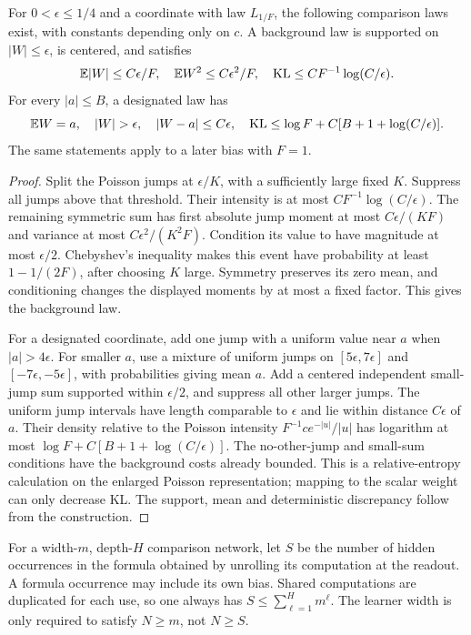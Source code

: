 \begin{lemma}
\label{lem:VG-scalar-comparison}
For $0<\epsilon\le1/4$ and a coordinate with law $L_{1/F}$, the following comparison laws exist, with constants depending only on $c$.
A background law is supported on $|W|\le\epsilon$, is centered, and satisfies
\[
 \mathbb E|W|\le C\epsilon/F,\quad
 \mathbb E W^2\le C\epsilon^2/F,\quad
 \operatorname{KL}\le C F^{-1}\log(C/\epsilon).
\]
For every $|a|\le B$, a designated law has
\[
 \E W=a,\quad |W|>\epsilon,\quad |W-a|\le C\epsilon,\quad
 \KL\le\log F+C[B+1+\log(C/\epsilon)].
\]
The same statements apply to a later bias with $F=1$.
\end{lemma}
\begin{proof}
Split the Poisson jumps at $\epsilon/K$, with a sufficiently large fixed $K$. Suppress all jumps above that threshold. Their intensity is at most
$CF^{-1}\log(C/\epsilon)$. The remaining symmetric sum has first absolute jump moment at most $C\epsilon/(KF)$ and variance at most
$C\epsilon^2/(K^2F)$. Condition its value to have magnitude at most $\epsilon/2$. Chebyshev's inequality makes this event have probability at least $1-1/(2F)$, after choosing $K$ large. Symmetry preserves its zero mean, and conditioning changes the displayed moments by at most a fixed factor. This gives the background law.

For a designated coordinate, add one jump with a uniform value near $a$ when $|a|>4\epsilon$. For smaller $a$, use a mixture of uniform jumps on $[5\epsilon,7\epsilon]$ and $[-7\epsilon,-5\epsilon]$, with probabilities giving mean $a$. Add a centered independent small-jump sum supported within $\epsilon/2$, and suppress all other larger jumps. The uniform jump intervals have length comparable to $\epsilon$ and lie within distance $C\epsilon$ of $a$. Their density relative to the Poisson intensity $F^{-1}c e^{-|u|}/|u|$ has logarithm at most
$\log F+C[B+1+\log(C/\epsilon)]$. The no-other-jump and small-sum conditions have the background costs already bounded. This is a relative-entropy calculation on the enlarged Poisson representation; mapping to the scalar weight can only decrease KL. The support, mean and deterministic discrepancy follow from the construction.
\end{proof}

For a width-$m$, depth-$H$ comparison network, let $S$ be the number of hidden occurrences in the formula obtained by unrolling its computation at the readout. A formula occurrence may include its own bias. Shared computations are duplicated for each use, so one always has $S\le\sum_{\ell=1}^H m^\ell$. The learner width is only required to satisfy $N\ge m$, not $N\ge S$.

